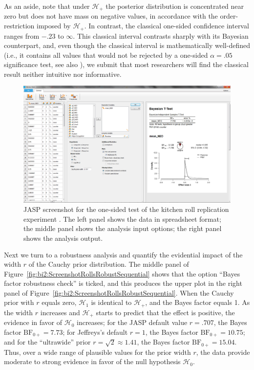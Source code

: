As an aside, note that under $\mathcal{H}_+$ the posterior distribution is concentrated near zero but does not have mass on negative values, in accordance with the order-restriction imposed by $\mathcal{H}_+$. In contrast, the classical one-sided confidence interval ranges from $-.23$ to $\infty$. This classical interval contrasts sharply with its Bayesian counterpart, and, even though the classical interval is mathematically well-defined (i.e., it contains all values that would not be rejected by a one-sided $\alpha=.05$ significance test, see also ), we submit that most researchers will find the classical result neither intuitive nor informative.

\begin{figure}[!tp]
    \begin{center}
        \includegraphics[width=.99\textwidth]{figs/bi2_ScreenshotRollsOneSided.eps}
        \caption{JASP screenshot for the one-sided test of the kitchen roll replication experiment \protect\cite{WagenmakersEtAl2015Kitchen}. The left panel shows the data in spreadsheet format; the middle panel shows the analysis input options; the right panel shows the analysis output.} \label{fig:bi2:ScreenshotRollsOneSided}
    \end{center}
\end{figure}

Next we turn to a robustness analysis and quantify the evidential impact of the width $r$ of the Cauchy prior distribution.
The middle panel of Figure~\ref{fig:bi2:ScreenshotRollsRobustSequential} shows that the option ``Bayes factor robustness check'' is ticked, and this produces the upper plot in the right panel of Figure~\ref{fig:bi2:ScreenshotRollsRobustSequential}. When the Cauchy prior with $r$ equals zero, $\mathcal{H}_1$ is identical to $\mathcal{H}_+$, and the Bayes factor equals 1. As the width $r$ increases and $\mathcal{H}_+$ starts to predict that the effect is positive, the evidence in favor of $\mathcal{H}_0$ increases; for the JASP default value $r=.707$, the Bayes factor $\text{BF}_{0+} = 7.73$; for Jeffreys's default $r=1$, the Bayes factor $\text{BF}_{0+} = 10.75$; and for the ``ultrawide'' prior $r = \sqrt{2} \approx 1.41$, the Bayes factor $\text{BF}_{0+} = 15.04$. Thus, over a wide range of plausible values for the prior width $r$, the data provide moderate to strong evidence in favor of the null hypothesis $\mathcal{H}_0$.

